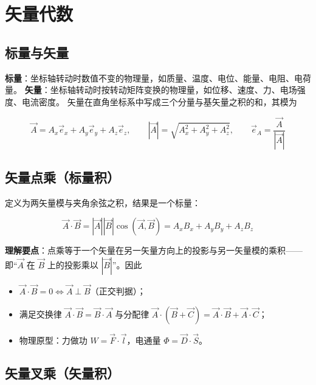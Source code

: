 
\section{矢量代数}

\subsection{标量与矢量}

\textbf{标量}：坐标轴转动时数值不变的物理量，如质量、温度、电位、能量、电阻、电荷量。
\textbf{矢量}：坐标轴转动时按转动矩阵变换的物理量，如位移、速度、力、电场强度、电流密度。
矢量在直角坐标系中写成三个分量与基矢量之积的和，其模为
\begin{formulaBox}
\[
\vec{A}=A_x\vec{e}_x+A_y\vec{e}_y+A_z\vec{e}_z,\qquad
|\vec{A}|=\sqrt{A_x^2+A_y^2+A_z^2},\qquad
\vec{e}_A=\frac{\vec{A}}{|\vec{A}|}
\]
\end{formulaBox}

\subsection{矢量点乘（标量积）}

定义为两矢量模与夹角余弦之积，结果是一个标量：
\begin{formulaBox}
\[
\vec{A}\cdot\vec{B}=|\vec{A}||\vec{B}|\cos(\vec{A},\vec{B})
=A_xB_x+A_yB_y+A_zB_z
\]
\end{formulaBox}

\textbf{理解要点}：点乘等于一个矢量在另一矢量方向上的投影与另一矢量模的乘积——即“$\vec{A}$ 在
$\vec{B}$ 上的投影乘以 $|\vec{B}|$”。因此

\begin{itemize}
    \item $\vec{A}\cdot\vec{B}=0\iff \vec{A}\perp\vec{B}$（正交判据）；
    \item 满足交换律 $\vec{A}\cdot\vec{B}=\vec{B}\cdot\vec{A}$ 与分配律
    $\vec{A}\cdot(\vec{B}+\vec{C})=\vec{A}\cdot\vec{B}+\vec{A}\cdot\vec{C}$；
    \item 物理原型：力做功 $W=\vec{F}\cdot\vec{l}$，电通量 $\Phi=\vec{D}\cdot\vec{S}$。
\end{itemize}

\subsection{矢量叉乘（矢量积）}

